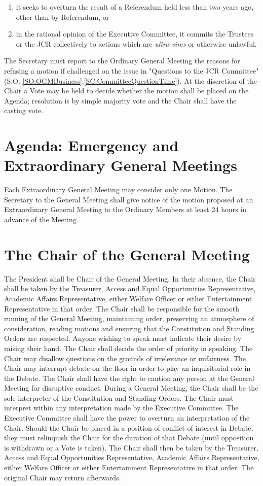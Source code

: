 \begin{enumerate}
    \item it seeks to overturn the result of a Referendum held less than two years ago, other than by Referendum, or
    \item in the rational opinion of the Executive Committee, it commits the Trustees or the JCR collectively to actions which are \emph{ultra vires} or otherwise unlawful.
\end{enumerate} 
\npara The Secretary must report to the Ordinary General Meeting the reasons for refusing a motion if challenged on the issue in "Questions to the JCR Committee" (S.O. \ref{SO:OGMBusiness}.\ref{SC:CommitteeQuestionTime}). At the discretion of the Chair a Vote may be held to decide whether the motion shall be placed on the Agenda; resolution is by simple majority vote and the Chair shall have the casting vote.
\section{Agenda: Emergency and Extraordinary General Meetings}
\npara Each Extraordinary General Meeting may consider only one Motion.
\npara The Secretary to the General Meeting shall give notice of the motion proposed at an Extraordinary General Meeting to the Ordinary Members at least 24 hours in advance of the Meeting.
\section{The Chair of the General Meeting} \label{gm:chair}
\npara \label{SO:GMChair} The President shall be Chair of the General Meeting. In their absence, the Chair shall be taken by the Treasurer, Access and Equal Opportunities Representative, Academic Affairs Representative, either Welfare Officer or either Entertainment Representative in that order.
\npara The Chair shall be responsible for the smooth running of the General Meeting, maintaining order, preserving an atmosphere of consideration, reading motions and ensuring that the Constitution and Standing Orders are respected.
\npara Anyone wishing to speak must indicate their desire by raising their hand. The Chair shall decide the order of priority in speaking.
\npara The Chair may disallow questions on the grounds of irrelevance or unfairness.
\npara The Chair may interrupt debate on the floor in order to play an inquisitorial role in the Debate.
\npara The Chair shall have the right to caution any person at the General Meeting for disruptive conduct.
\npara During a General Meeting, the Chair shall be the sole interpreter of the Constitution and Standing Orders.  The Chair must interpret within any interpretation made by the Executive Committee.  The Executive Committee shall have the power to overturn an interpretation of the Chair.
\npara Should the Chair be placed in a position of conflict of interest in Debate, they must relinquish the Chair for the duration of that Debate (until opposition is withdrawn or a Vote is taken). The Chair shall then be taken by the Treasurer, Access and Equal Opportunities Representative, Academic Affairs Representative, either Welfare Officer or either Entertainment Representative in that order. The original Chair may return afterwards.
